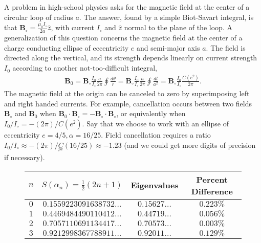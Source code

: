 \documentclass[nofootinbib,preprint]{revtex4-1}
\begin{document}
A problem in high-school physics asks for the magnetic field at the center of 
a circular loop of radius $a$. The answer, found by a simple Biot-Savart integral, 
is that $\mathbf{B}_{\circ} = \frac{\mu_0 I_{\circ}}{2a} \hat{z}$, with current $I_{\circ}$
and $\hat{z}$ normal to the plane of the loop. A generalization of this question 
concerns the magnetic field at the center of a charge conducting ellipse of eccentricity 
$e$ and semi-major axis $a$. The field is directed along the vertical, and its strength 
depends linearly on current strength $I_0$ according to another not-too-difficult integral,
\begin{eqnarray}
\mathbf{B}_{0} = \mathbf{B}_{\circ}\frac{I_0}{I_{\circ}}\frac{a}{2\pi} \oint \frac{d\theta}{r} = 
\mathbf{B}_{\circ}\frac{I_0}{I_{\circ}}\frac{a}{2\pi} \oint \frac{dl}{a^2} = 
\mathbf{B}_{\circ}\frac{I_0}{I_{\circ}}\frac{C(e^2)}{2\pi} \nonumber .
\end{eqnarray}
The magnetic field at the origin can be canceled to zero by superimposing left and right 
handed currents. For example, cancellation occurs between two fields $\mathbf{B}_{\circ}$
and $\mathbf{B}_{0}$ when $\mathbf{B}_{0} \cdot \mathbf{B}_{\circ} = -\mathbf{B}_{\circ} \cdot \mathbf{B}_{\circ}$,
or equivalently when $I_0/I_{\circ} = -(2 \pi)/C(e^2)$. Say that we choose to work with 
an ellipse of eccentricity $e=4/5, \alpha = 16/25$. Field cancellation requires
a ratio $I_0/I_{\circ} \approx -(2 \pi)/\underset{^{pw}}{C}(16/25) \approx -1.23$ 
(and we could get more digits of precision if necessary).



\begin{figure}[t]
\begin{center}
\begin{tabular}{ c | c | c | c }
\hline \hline
 \;\;\;$n$\;\;\; 
 & \;\;\;\;\;\;\;\;\;\;\;\; $ S(\alpha_n)=\frac{1}{2}(2n+1) $ \;\;\;\;\;\;\;\;\;\;\;\;  
 & \;\;\;\;\;\;\;\;   Eigenvalues \;\;\;\;\;\;\;\;   & \;\; Percent Difference \;\; \\
\hline
$0$ & $0.1559223091638732\ldots$   & $0.15627\ldots$ & $0.223\%$ \\
$1$ & $0.4469484490110412\ldots$   & $0.44719\ldots$ & $0.056\%$ \\
$2$ & $0.7057110691134417\ldots$   & $0.70573\ldots$ & $0.003\%$ \\
$3$ & $0.9212998367788911\ldots$   & $0.92011\ldots$ & $0.129\%$
\label{tab:SolvedVals}
\end{tabular}
\end{center}
\end{figure}
\end{document}
